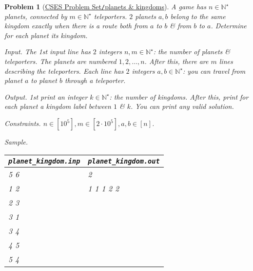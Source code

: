 \documentclass{article}
\newtheorem{problem}{Problem}
\begin{document}
\begin{problem}[\href{https://cses.fi/problemset/task/1683}{CSES Problem Set{\tt/}planets \& kingdoms}]
    A game has $n\in\mathbb{N}^\star$ planets, connected by $m\in\mathbb{N}^\star$ teleporters. $2$ planets $a,b$ belong to the same kingdom exactly when there is a route both from $a$ to $b$ \& from $b$ to $a$. Determine for each planet its kingdom.
    \item {\sf Input.} The 1st input line has $2$ integers $n,m\in\mathbb{N}^\star$: the number of planets \& teleporters. The planets are numbered $1,2,\ldots,n$. After this, there are $m$ lines describing the teleporters. Each line has $2$ integers $a,b\in\mathbb{N}^\star$: you can travel from planet $a$ to planet $b$ through a teleporter.
    \item {\sf Output.} 1st print an integer $k\in\mathbb{N}^\star$: the number of kingdoms. After this, print for each planet a kingdom label between $1$ \& $k$. You can print any valid solution.
    \item {\sf Constraints.} $n\in[10^5],m\in[2\cdot10^5],a,b\in[n]$.
    \item {\sf Sample.}
    \begin{table}[H]
        \centering
        \begin{tabular}{|l|l|}
            \hline
            \verb|planet_kingdom.inp| & \verb|planet_kingdom.out| \\
            \hline
            5 6 & 2 \\
            1 2 & 1 1 1 2 2 \\
            2 3 & \\
            3 1 & \\
            3 4 & \\
            4 5 & \\
            5 4 & \\
            \hline
        \end{tabular}
    \end{table}
\end{problem}
\end{document}
